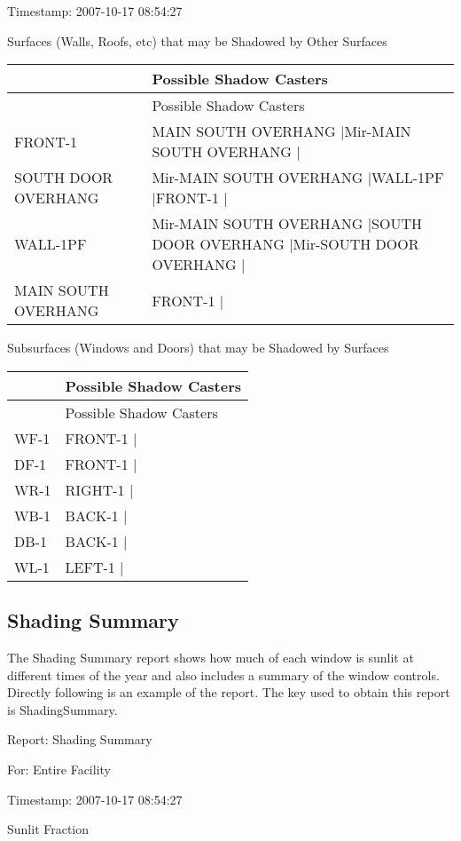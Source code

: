 Timestamp: 2007-10-17 08:54:27

Surfaces (Walls, Roofs, etc) that may be Shadowed by Other Surfaces

\begin{longtable}[c]{>{\raggedright}p{1.5in}>{\raggedright}p{4.5in}}
\toprule 
~ & Possible Shadow Casters \tabularnewline
\midrule
\endfirsthead

\toprule 
~ & Possible Shadow Casters \tabularnewline
\midrule
\endhead

FRONT-1 & MAIN SOUTH OVERHANG |Mir-MAIN SOUTH OVERHANG | \tabularnewline
SOUTH DOOR OVERHANG & Mir-MAIN SOUTH OVERHANG |WALL-1PF |FRONT-1 | \tabularnewline
WALL-1PF & Mir-MAIN SOUTH OVERHANG |SOUTH DOOR OVERHANG |Mir-SOUTH DOOR OVERHANG | \tabularnewline
MAIN SOUTH OVERHANG & FRONT-1 | \tabularnewline
\bottomrule
\end{longtable}

Subsurfaces (Windows and Doors) that may be Shadowed by Surfaces

\begin{longtable}[c]{@{}ll@{}}
\toprule 
~ & Possible Shadow Casters \tabularnewline
\midrule
\endfirsthead

\toprule 
~ & Possible Shadow Casters \tabularnewline
\midrule
\endhead

WF-1 & FRONT-1 | \tabularnewline
DF-1 & FRONT-1 | \tabularnewline
WR-1 & RIGHT-1 | \tabularnewline
WB-1 & BACK-1 | \tabularnewline
DB-1 & BACK-1 | \tabularnewline
WL-1 & LEFT-1 | \tabularnewline
\bottomrule
\end{longtable}

\subsection{Shading Summary}\label{shading-summary-000}

The Shading Summary report shows how much of each window is sunlit at different times of the year and also includes a summary of the window controls. Directly following is an example of the report. The key used to obtain this report is ShadingSummary.

Report: Shading Summary

For: Entire Facility

Timestamp: 2007-10-17 08:54:27

Sunlit Fraction

